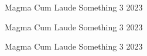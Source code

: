 


\begin{cvhonors}
  
\cvhonor
  {Magma Cum Laude}
  {}
  {Something 3}
  {2023}
  
\cvhonor
  {Magma Cum Laude}
  {}
  {Something 3}
  {2023}
  
\cvhonor
  {Magma Cum Laude}
  {}
  {Something 3}
  {2023}
  
\end{cvhonors}
